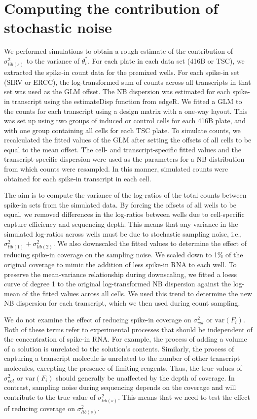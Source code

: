 \documentclass{article}
\newcommand\variance{\mbox{var}}
\begin{document}
\section{Computing the contribution of stochastic noise}
We performed simulations to obtain a rough estimate of the contribution of $\sigma^2_{lib(s)}$ to the variance of $\theta^*_i$.
For each plate in each data set (416B or TSC), we extracted the spike-in count data for the premixed wells.
For each spike-in set (SIRV or ERCC), the log-transformed sum of counts across all transcripts in that set was used as the GLM offset. 
The NB dispersion was estimated for each spike-in transcript using the estimateDisp function from edgeR.
We fitted a GLM to the counts for each transcript using a design matrix with a one-way layout.
This was set up using two groups of induced or control cells for each 416B plate, and with one group containing all cells for each TSC plate.
To simulate counts, we recalculated the fitted values of the GLM after setting the offsets of all cells to be equal to the mean offset.
The cell- and transcript-specific fitted values and the transcript-specific dispersion were used as the parameters for a NB distribution from which counts were resampled.
In this manner, simulated counts were obtained for each spike-in transcript in each cell.

The aim is to compute the variance of the log-ratios of the total counts between spike-in sets from the simulated data.
By forcing the offsets of all wells to be equal, we removed differences in the log-ratios between wells due to cell-specific capture efficiency and sequencing depth.
This means that any variance in the simulated log-ratios across wells must be due to stochastic sampling noise, i.e.,  $\sigma^2_{lib(1)} + \sigma^2_{lib(2)}$.
We also downscaled the fitted values to determine the effect of reducing spike-in coverage on the sampling noise.
We scaled down to 1\% of the original coverage to mimic the addition of less spike-in RNA to each well.
To preserve the mean-variance relationship during downscaling, we fitted a loess curve of degree 1 to the original log-transformed NB dispersion against the log-mean of the fitted values across all cells.
We used this trend to determine the new NB dispersion for each transcript, which we then used during count sampling.

We do not examine the effect of reducing spike-in coverage on $\sigma^2_{vol}$ or $\variance(F_i)$.
Both of these terms refer to experimental processes that should be independent of the concentration of spike-in RNA.
For example, the process of adding a volume of a solution is unrelated to the solution's contents.
Similarly, the process of capturing a transcript molecule is unrelated to the number of other transcript molecules, excepting the presence of limiting reagents.
Thus, the true values of $\sigma^2_{vol}$ or $\variance(F_i)$ should generally be unaffected by the depth of coverage.
In contrast, sampling noise during sequencing depends on the coverage and will contribute to the true value of $\sigma^2_{lib(s)}$.
This means that we need to test the effect of reducing coverage on $\sigma^2_{lib(s)}$.
\end{document}
